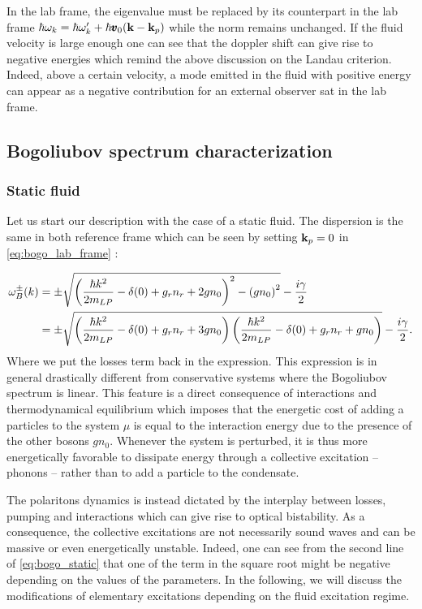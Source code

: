 In the lab frame, the eigenvalue must be replaced by its counterpart in the lab frame $\hbar\omega_k=\hbar\omega'_k+\hbar \pmb{v}_0(\mathbf{k}-\mathbf{k}_p)$ while the norm remains unchanged.
If the fluid velocity is large enough one can see that the doppler shift can give rise to negative energies which remind the above discussion on the Landau criterion. Indeed, above a certain 
velocity, a mode emitted in the fluid with positive energy can appear as a negative contribution for an external observer sat in the lab frame.


\subsection{Bogoliubov spectrum characterization}
 
\subsubsection{Static fluid}
Let us start our description with the case of a static fluid. The dispersion is the same in both reference frame which can be seen by setting $\mathbf{k}_p=0$ 
in \autoref{eq:bogo_lab_frame} :

\begin{equation}
    \begin{aligned}
    \omega^\pm_B(k)&= \pm\sqrt{\left(\dfrac{\hbar k^2}{2m_{LP}}-\delta(0)+ g_rn_r +2g n_0\right)^2 - \left(g n_0\right)^2}-\dfrac{i\gamma}{2} \\
                   &= \pm\sqrt{\left(\dfrac{\hbar k^2}{2m_{LP}}-\delta(0)+ g_rn_r +3g n_0\right)\left(\dfrac{\hbar k^2}{2m_{LP}}-\delta(0)+ g_rn_r +g n_0\right)}-\dfrac{i\gamma}{2}.
    \label{eq:bogo_static}
    \end{aligned}
\end{equation}
Where we put the losses term back in the expression. 
This expression is in general drastically different from conservative systems where the Bogoliubov spectrum is linear. This feature is a direct consequence of 
interactions and thermodynamical equilibrium which imposes that the energetic cost of adding a particles to the system $\mu$ is equal
to the interaction energy due to the presence of the other bosons $gn_0$. Whenever the system is perturbed, it is thus more energetically favorable 
to dissipate energy through a collective excitation -- phonons -- rather than to add a particle to the condensate.

\bigskip

The polaritons dynamics is instead dictated by the interplay between losses, pumping and interactions which can give rise to optical bistability. As a consequence, the 
collective excitations are not necessarily sound waves and can be massive or even energetically unstable. Indeed, one can see from the 
second line of \autoref{eq:bogo_static} that one of the term in the square root might be negative depending on the values of the parameters. In the following,
we will discuss the modifications of elementary excitations depending on the fluid excitation regime.

